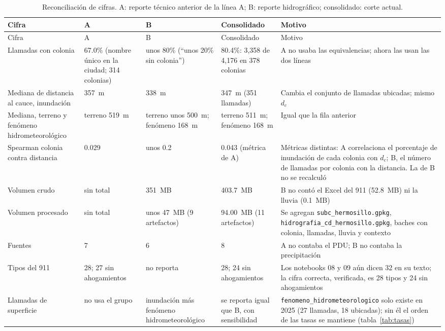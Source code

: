 \documentclass[11pt]{article}
\newcommand{\cod}[1]{\nolinkurl{#1}}
\begin{document}
\footnotesize
\setlength{\tabcolsep}{4pt}
\begin{longtable}{L{3.0cm} L{2.6cm} L{2.6cm} L{2.5cm} L{4.6cm}}
  \caption{Reconciliación de cifras. A: reporte técnico anterior de la línea A; B: reporte hidrográfico; consolidado: corte actual.}\label{tab:reconc}\\
  \toprule
  Cifra & A & B & Consolidado & Motivo \\
  \midrule
  \endfirsthead
  \toprule
  Cifra & A & B & Consolidado & Motivo \\
  \midrule
  \endhead
  \bottomrule
  \endfoot
  Llamadas con colonia & 67.0\% (nombre único en la ciudad; 314 colonias) & unos 80\% (``unos 20\% sin colonia'') & 80.4\%: 3,358 de 4,176 en 378 colonias & A no usaba las equivalencias; ahora las usan las dos líneas \\
  Mediana de distancia al cauce, inundación & 357~m & 338~m & 347~m (351 llamadas) & Cambia el conjunto de llamadas ubicadas; mismo $d_c$ \\
  Mediana, terreno y fenómeno hidrometeorológico & terreno 519~m & terreno unos 500~m; fenómeno 168~m & terreno 511~m; fenómeno 168~m & Igual que la fila anterior \\
  Spearman colonia contra distancia & 0.029 & unos 0.2 & 0.043 (métrica de A) & Métricas distintas: A correlaciona el porcentaje de inundación de cada colonia con $d_c$; B, el número de llamadas por colonia con la distancia. La de B no se recalculó \\
  Volumen crudo & sin total & 351~MB & 403.7~MB & B no contó el Excel del 911 (52.8~MB) ni la lluvia (0.1~MB) \\
  Volumen procesado & sin total & unos 47~MB (9 artefactos) & 94.00~MB (11 artefactos) & Se agregan \cod{subc_hermosillo.gpkg}, \cod{hidrografia_cd_hermosillo.gpkg}, baches con colonia, llamadas, lluvia y contexto \\
  Fuentes & 7 & 6 & 8 & A no contaba el PDU; B no contaba la precipitación \\
  Tipos del 911 & 28; 27 sin ahogamientos & no reporta & 28; 24 sin ahogamientos & Los notebooks 08 y 09 aún dicen 32 en su texto; la cifra correcta, verificada, es 28 tipos y 24 sin ahogamientos \\
  Llamadas de superficie & no usa el grupo & inundación más fenómeno hidrometeorológico & se reporta igual que B, con sensibilidad & \cod{fenomeno_hidrometeorologico} solo existe en 2025 (27 llamadas, 18 ubicadas); sin él el orden de las tasas se mantiene (tabla~\ref{tab:tasas}) \\

\end{longtable}
\end{document}
